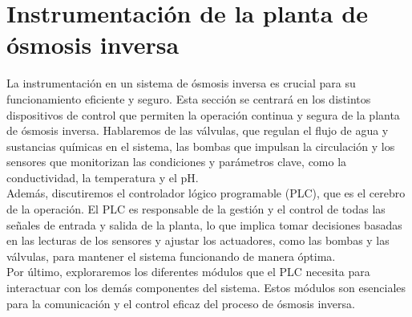 \section{Instrumentación de la planta de ósmosis inversa}


La instrumentación en un sistema de ósmosis inversa es crucial para su funcionamiento eficiente y seguro.
Esta sección se centrará en los distintos dispositivos de control que permiten la operación continua y
segura de la planta de ósmosis inversa. Hablaremos de las válvulas, que regulan el flujo de agua y sustancias
químicas en el sistema, las bombas que impulsan la circulación y los sensores que monitorizan
las condiciones y parámetros clave, como la conductividad, la temperatura y el pH.\\

Además, discutiremos el controlador lógico programable (PLC), que es el cerebro de la operación. El PLC es responsable
de la gestión y el control de todas las señales de entrada y salida de la planta, lo que implica tomar decisiones basadas
en las lecturas de los sensores y ajustar los actuadores, como las bombas y las válvulas, para mantener el sistema
funcionando de manera óptima.\\

Por último, exploraremos los diferentes módulos que el PLC necesita para interactuar con los demás componentes del sistema.
Estos módulos son esenciales para la comunicación y el control eficaz del proceso de ósmosis inversa.\\




% 

